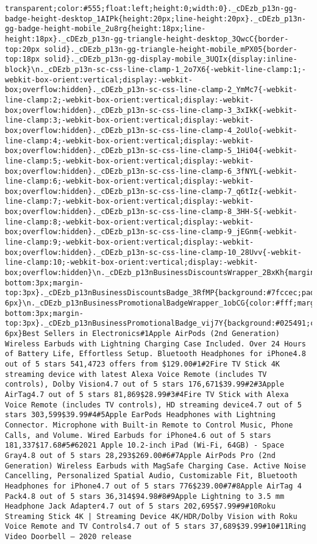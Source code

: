 \documentclass[
]{article}
\begin{document}
\begin{verbatim}
transparent;color:#555;float:left;height:0;width:0}._cDEzb_p13n-gg-badge-height-desktop_1AIPk{height:20px;line-height:20px}._cDEzb_p13n-gg-badge-height-mobile_2u8rg{height:18px;line-height:18px}._cDEzb_p13n-gg-triangle-height-desktop_3QwcC{border-top:20px solid}._cDEzb_p13n-gg-triangle-height-mobile_mPX05{border-top:18px solid}._cDEzb_p13n-gg-display-mobile_3UQIx{display:inline-block}\n._cDEzb_p13n-sc-css-line-clamp-1_2o7X6{-webkit-line-clamp:1;-webkit-box-orient:vertical;display:-webkit-box;overflow:hidden}._cDEzb_p13n-sc-css-line-clamp-2_YmMc7{-webkit-line-clamp:2;-webkit-box-orient:vertical;display:-webkit-box;overflow:hidden}._cDEzb_p13n-sc-css-line-clamp-3_3xIkK{-webkit-line-clamp:3;-webkit-box-orient:vertical;display:-webkit-box;overflow:hidden}._cDEzb_p13n-sc-css-line-clamp-4_2oUlo{-webkit-line-clamp:4;-webkit-box-orient:vertical;display:-webkit-box;overflow:hidden}._cDEzb_p13n-sc-css-line-clamp-5_1Hi04{-webkit-line-clamp:5;-webkit-box-orient:vertical;display:-webkit-box;overflow:hidden}._cDEzb_p13n-sc-css-line-clamp-6_3fNYL{-webkit-line-clamp:6;-webkit-box-orient:vertical;display:-webkit-box;overflow:hidden}._cDEzb_p13n-sc-css-line-clamp-7_q6tIz{-webkit-line-clamp:7;-webkit-box-orient:vertical;display:-webkit-box;overflow:hidden}._cDEzb_p13n-sc-css-line-clamp-8_3HH-S{-webkit-line-clamp:8;-webkit-box-orient:vertical;display:-webkit-box;overflow:hidden}._cDEzb_p13n-sc-css-line-clamp-9_jEGnm{-webkit-line-clamp:9;-webkit-box-orient:vertical;display:-webkit-box;overflow:hidden}._cDEzb_p13n-sc-css-line-clamp-10_28Uvv{-webkit-line-clamp:10;-webkit-box-orient:vertical;display:-webkit-box;overflow:hidden}\n._cDEzb_p13nBusinessDiscountsWrapper_2BxKh{margin-bottom:3px;margin-top:3px}._cDEzb_p13nBusinessDiscountsBadge_3RfMP{background:#7fccec;padding:3px 6px}\n._cDEzb_p13nBusinessPromotionalBadgeWrapper_1obCG{color:#fff;margin-bottom:3px;margin-top:3px}._cDEzb_p13nBusinessPromotionalBadge_vij7Y{background:#025491;color:#fff;padding:4px 6px}Best Sellers in Electronics#1Apple AirPods (2nd Generation) Wireless Earbuds with Lightning Charging Case Included. Over 24 Hours of Battery Life, Effortless Setup. Bluetooth Headphones for iPhone4.8 out of 5 stars 541,4723 offers from $129.00#1#2Fire TV Stick 4K streaming device with latest Alexa Voice Remote (includes TV controls), Dolby Vision4.7 out of 5 stars 176,671$39.99#2#3Apple AirTag4.7 out of 5 stars 81,869$28.99#3#4Fire TV Stick with Alexa Voice Remote (includes TV controls), HD streaming device4.7 out of 5 stars 303,599$39.99#4#5Apple EarPods Headphones with Lightning Connector. Microphone with Built-in Remote to Control Music, Phone Calls, and Volume. Wired Earbuds for iPhone4.6 out of 5 stars 181,337$17.68#5#62021 Apple 10.2-inch iPad (Wi-Fi, 64GB) - Space Gray4.8 out of 5 stars 28,293$269.00#6#7Apple AirPods Pro (2nd Generation) Wireless Earbuds with MagSafe Charging Case. Active Noise Cancelling, Personalized Spatial Audio, Customizable Fit, Bluetooth Headphones for iPhone4.7 out of 5 stars 776$239.00#7#8Apple AirTag 4 Pack4.8 out of 5 stars 36,314$94.98#8#9Apple Lightning to 3.5 mm Headphone Jack Adapter4.7 out of 5 stars 202,695$7.99#9#10Roku Streaming Stick 4K | Streaming Device 4K/HDR/Dolby Vision with Roku Voice Remote and TV Controls4.7 out of 5 stars 37,689$39.99#10#11Ring Video Doorbell – 2020 release 
\end{verbatim}
\end{document}
